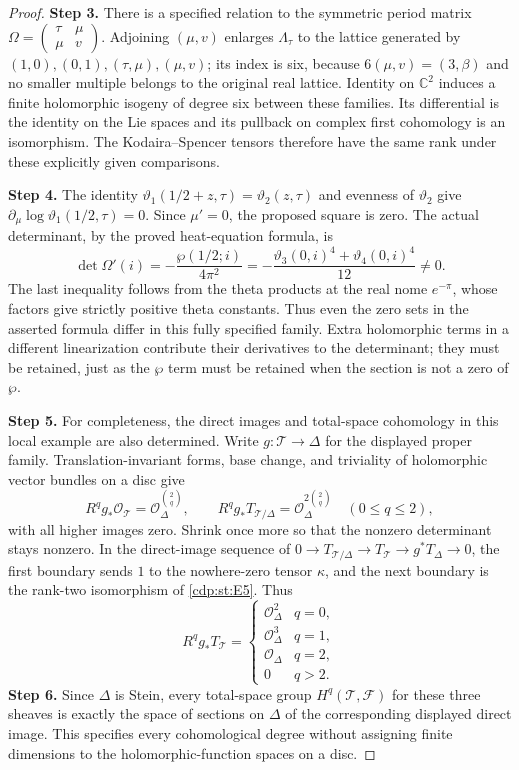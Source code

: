\begin{proof}
\noindent\textbf{Step 3.} There is a specified relation to the symmetric period matrix
$\Omega=\left(\begin{smallmatrix}\tau&\mu\\\mu&v\end{smallmatrix}\right)$.
Adjoining $(\mu,v)$ enlarges $\Lambda_\tau$ to the lattice
generated by $(1,0),(0,1),(\tau,\mu),(\mu,v)$; its index is six,
because $6(\mu,v)=(3,\beta)$ and no smaller multiple belongs
to the original real lattice. Identity on $\mathbb C^2$ induces
a finite holomorphic isogeny of degree six between these families.
Its differential is the identity on the Lie spaces and its
pullback on complex first cohomology is an isomorphism. The
Kodaira--Spencer tensors therefore have the same rank under
these explicitly given comparisons.

\noindent\textbf{Step 4.} The identity $\vartheta_1(1/2+z,\tau)=\vartheta_2(z,\tau)$
and evenness of $\vartheta_2$ give
$\partial_\mu\log\vartheta_1(1/2,\tau)=0$. Since $\mu'=0$,
the proposed square is zero. The actual determinant, by the
proved heat-equation formula, is
\cite[eqs.~20.7.5, 20.13.1, 23.3.9 and 23.6.2]{DLMFTheta2026}
\[
 \det\Omega'(i)=-\frac{\wp(1/2;i)}{4\pi^2}
 =-\frac{\vartheta_3(0,i)^4+\vartheta_4(0,i)^4}{12}\ne0.
\]
The last inequality follows from the theta products at the real
nome $e^{-\pi}$, whose factors give strictly positive theta
constants. Thus even the zero sets in the asserted formula
differ in this fully specified family. Extra holomorphic terms
in a different linearization contribute their derivatives to
the determinant; they must be retained, just as the $\wp$ term
must be retained when the section is not a zero of $\wp$.

\noindent\textbf{Step 5.} For completeness, the direct images and total-space cohomology
in this local example are also determined. Write
$g:\mathscr T\to\Delta$ for the displayed proper family.
Translation-invariant forms, base change, and triviality of
holomorphic vector bundles on a disc give
\[
 R^qg_*\mathcal O_{\mathscr T}
   =\mathcal O_\Delta^{\binom2q},\qquad
 R^qg_*T_{\mathscr T/\Delta}
   =\mathcal O_\Delta^{2\binom2q}\quad(0\leq q\leq2),
\]
with all higher images zero. Shrink once more so that the
nonzero determinant stays nonzero. In the direct-image sequence
of $0\to T_{\mathscr T/\Delta}\to T_{\mathscr T}
\to g^*T_\Delta\to0$, the first boundary sends $1$ to the
nowhere-zero tensor $\kappa$, and the next boundary is the
rank-two isomorphism of \ref{cdp:st:E5}. Thus
\[
 R^qg_*T_{\mathscr T}=
 \begin{cases}
  \mathcal O_\Delta^2&q=0,\\
  \mathcal O_\Delta^3&q=1,\\
  \mathcal O_\Delta&q=2,\\
  0&q>2.
 \end{cases}
\]
\noindent\textbf{Step 6.} Since $\Delta$ is Stein, every total-space group
$H^q(\mathscr T,\mathcal F)$ for these three sheaves is exactly
the space of sections on $\Delta$ of the corresponding displayed
direct image. This specifies every cohomological degree without
assigning finite dimensions to the holomorphic-function spaces
on a disc.
\end{proof}